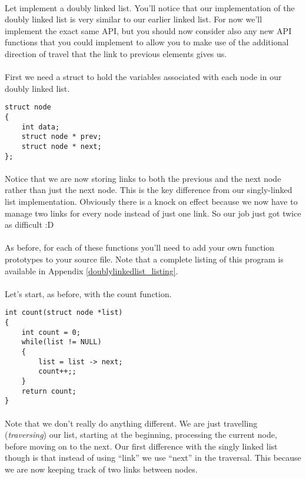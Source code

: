 \documentclass[10pt, a4paper, twosize]{article}
\begin{document}
\paragraph{} Let implement a doubly linked list. You'll notice that our implementation of the doubly linked list is very similar to our earlier linked list. For now we'll implement the exact same API, but you should now consider also any new API functions that you could implement to allow you to make use of the additional direction of travel that the link to previous elements gives us.


\paragraph{} First we need a struct to hold the variables associated with each node in our doubly linked list. 
\begin{lstlisting}
struct node
{
    int data;
    struct node * prev;
    struct node * next;
};
\end{lstlisting}
\paragraph{} Notice that we are now storing links to both the previous and the next node rather than just the next node. This is the key difference from our singly-linked list implementation. Obviously there is a knock on effect because we now have to manage two links for every node instead of just one link. So our job just got twice as difficult :D

\paragraph{} As before, for each of these functions you'll need to add your own function prototypes to your source file. Note that a complete listing of this program is available in Appendix \ref{doublylinkedlist_listing}. 

\paragraph{} Let's start, as before, with the count function. 
\begin{lstlisting}
int count(struct node *list)
{
    int count = 0;
    while(list != NULL)
    {
        list = list -> next;
        count++;;
    }
    return count;
}
\end{lstlisting}
\paragraph{} Note that we don't really do anything different. We are just travelling (\emph{traversing}) our list, starting at the beginning, processing the current node, before moving on to the next. Our first difference with the singly linked list though is that instead of using ``link'' we use ``next'' in the traversal. This because we are now keeping track of two links between nodes.
\end{document}
